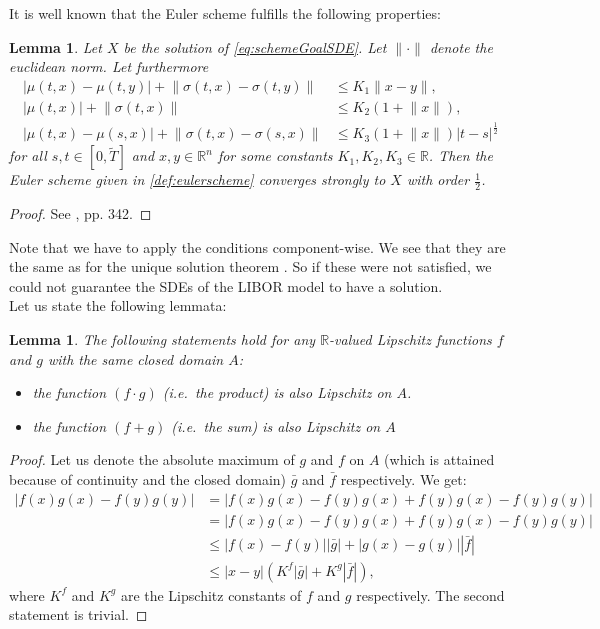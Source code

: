 \documentclass[12pt]{article}
\newtheorem{lemma}[theorem]{Lemma}
\begin{document}
	It is well known that the Euler scheme fulfills the  following properties:
	\begin{lemma}
		Let $X$ be the solution of \cref{eq:schemeGoalSDE}. Let  $\lVert\cdot\rVert$ denote the euclidean norm.
		Let furthermore 
		\begin{align}
			|\mu(t,x) - \mu(t,y)| + \lVert\sigma(t,x) - \sigma(t,y)\rVert &\le K_1 \lVert x - y\rVert, \label{eq:lipschitzcont}\\
			|\mu(t,x)| + \lVert\sigma(t,x)\rVert &\le K_2(1+\lVert x\rVert),\label{eq:lineargrowth}\\
			|\mu(t,x) - \mu(s,x)| + \lVert\sigma(t,x) - \sigma(s,x)\rVert &\le K_3 (1+\lVert x\rVert) |t - s|^{\frac{1}{2}}\label{eq:timelipschitz}
		\end{align}
		for all $s,t \in \left[0,\tilde{T}\right]$ and $x,y\in \mathbb{R}^n$ for some constants $K_1, K_2, K_3 \in \mathbb{R}$.
		Then the Euler scheme given in \cref{def:eulerscheme} converges strongly to $X$ with order $\frac{1}{2}$.
	\end{lemma}
	\begin{proof}
		See \cite{kloedenSchemes}, pp. 342.
	\end{proof}
	Note that we have to apply the conditions component-wise. We see that they are the same as for the unique solution theorem \cite{fima2Lecture}. So if these were not satisfied, we could not guarantee the SDEs of the LIBOR model to have a solution.\\
	Let us state the following lemmata:
	\begin{lemma}\label{lem:basicLipschitz}
		The following statements hold for any $\mathbb{R}$-valued Lipschitz functions $f$ and $g$ with the same closed domain $A$:
		\begin{itemize}
			\item the function $(f\cdot g)$ (i.e.\ the product) is also Lipschitz on $A$.
			\item the function $(f + g)$ (i.e.\ the sum) is also Lipschitz on $A$
		\end{itemize}
	\end{lemma}
	\begin{proof}
		Let us denote the absolute maximum of $g$ and $f$ on $A$ (which is attained because of continuity and the closed domain) $\bar{g}$ and $\bar{f}$ respectively. We get:
		\begin{align*}
			|f(x)g(x) - f(y)g(y) | &= | f(x)g(x) - f(y)g(x) + f(y)g(x) - f(y)g(y)|\\
			&= | f(x)g(x) - f(y)g(x) + f(y)g(x) - f(y)g(y) |\\
			&\le | f(x) - f(y)| | \bar{g} | + | g(x) - g(y)| | \bar{f} |\\
			&\le | x - y| \left(K^f| \bar{g} | + K^g| \bar{f} |\right),
		\end{align*}
		where $K^f$ and $K^g$ are the Lipschitz constants of $f$ and $g$ respectively.
		The second statement is trivial.
	\end{proof}
\end{document}
